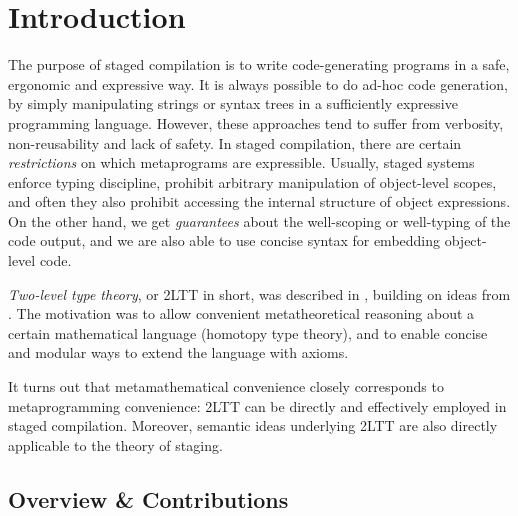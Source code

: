 \documentclass[acmsmall,screen]{acmart}
\theoremstyle{remark}
\begin{document}




\maketitle

\section{Introduction}\label{sec:introduction}

The purpose of staged compilation is to write code-generating programs in a
safe, ergonomic and expressive way. It is always possible to do ad-hoc code
generation, by simply manipulating strings or syntax trees in a sufficiently
expressive programming language. However, these approaches tend to suffer from
verbosity, non-reusability and lack of safety. In staged compilation, there are
certain \emph{restrictions} on which metaprograms are expressible. Usually,
staged systems enforce typing discipline, prohibit arbitrary manipulation of
object-level scopes, and often they also prohibit accessing the internal
structure of object expressions. On the other hand, we get \emph{guarantees}
about the well-scoping or well-typing of the code output, and we are also able
to use concise syntax for embedding object-level code.

\emph{Two-level type theory}, or 2LTT in short, was described in
\cite{twolevel}, building on ideas from \cite{hts}. The motivation was to allow
convenient metatheoretical reasoning about a certain mathematical language
(homotopy type theory), and to enable concise and modular ways to extend the
language with axioms.

It turns out that metamathematical convenience closely corresponds to
metaprogramming convenience: 2LTT can be directly and effectively employed in
staged compilation. Moreover, semantic ideas underlying 2LTT are also directly
applicable to the theory of staging.

\subsection{Overview \& Contributions}\label{sec:overview}
\end{document}
